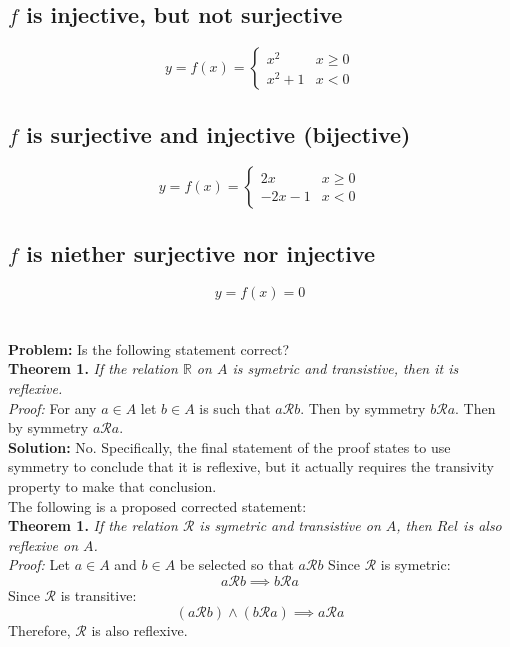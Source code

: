 \documentclass[]{article}
\newcommand{\Rel}{\mathcal{R}}
\newcommand{\R}{\mathbb{R}}
\begin{document}
\subsection{$f$ is injective, but not surjective}
\begin{displaymath}
	y = f(x) =
	\begin{cases}
		x^2 & x \geq 0\\
		x^2 + 1 & x < 0
	\end{cases}
\end{displaymath}


\subsection{$f$ is surjective and injective (bijective)}


\begin{displaymath}
	y = f(x) =
	\begin{cases}
		2 x & x \geq 0\\
		-2 x - 1 & x < 0
	\end{cases}
\end{displaymath}


\subsection{$f$ is niether surjective nor injective}

\begin{displaymath}
	y = f(x) = 0
\end{displaymath}












\newpage
\section{}
\textbf{Problem:}
Is the following statement correct?\\

\textbf{Theorem 1.}
\textit{If the relation $\R$ on $A$ is symetric and transistive, then it is reflexive.}\\
\textit{Proof:}
For any $a \in A$ let $b \in A$ is such that $a \Rel b$. Then by symmetry $b \Rel a$. 
Then by symmetry $a \Rel a$.\\

\textbf{Solution:}
No. Specifically, the final statement of the proof states to use symmetry to conclude that 
it is reflexive, but it actually requires the transivity property to make that conclusion.\\

The following is a proposed corrected statement:\\

\textbf{Theorem 1.}
\textit{If the relation $\Rel$ is symetric and transistive on $A$, then $Rel$ is also reflexive on $A$.}\\
\textit{Proof:}
Let $a \in A$ and $b \in A$ be selected so that $a \Rel b$
Since $\Rel$ is symetric: $$a \Rel b \implies b \Rel a$$
Since $\Rel$ is transitive: $$(a \Rel b) \land (b \Rel a) \implies a \Rel a$$
Therefore, $\Rel$ is also reflexive.
\end{document}

